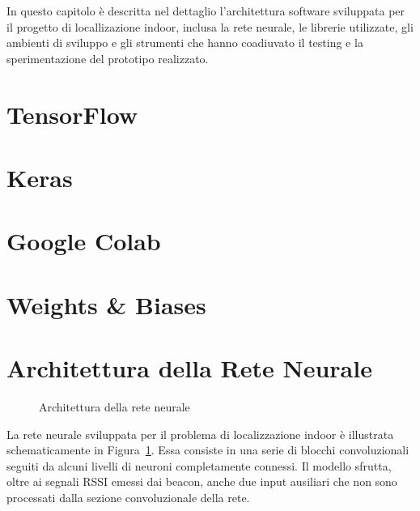 
\newcommand{\yhatone}{\bm\hat{\bm y}_1}
\newcommand{\yhattwo}{\bm\hat{\bm y}_2}
\newcommand{\yold}{\bm y_{\mathit{old}}}
In questo capitolo è descritta nel dettaglio l'architettura software sviluppata
per il progetto di locallizazione indoor, inclusa la rete neurale, le librerie
utilizzate, gli ambienti di sviluppo e gli strumenti che hanno coadiuvato il
testing e la sperimentazione del prototipo realizzato.
\section{TensorFlow}
\section{Keras}
\section{Google Colab}
\section{Weights \& Biases}
\section{Architettura della Rete Neurale}
\begin{figure}[!htp]
  \caption{Architettura della rete neurale}%
  \label{fig:crynet}%
\end{figure}
La rete neurale sviluppata per il problema di localizzazione indoor è
illustrata schematicamente in Figura~\ref{fig:crynet}. Essa consiste in una
serie di blocchi convoluzionali seguiti da alcuni livelli di neuroni
completamente connessi. Il modello sfrutta, oltre ai segnali RSSI emessi dai
beacon, anche due input ausiliari che non sono processati dalla sezione
convoluzionale della rete.
